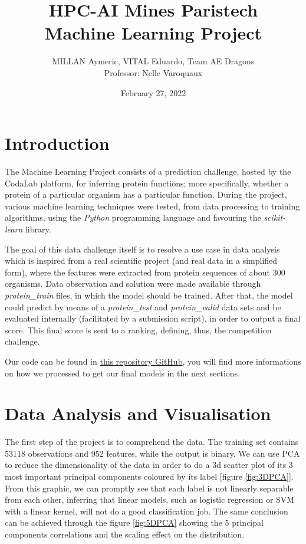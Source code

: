 \documentclass[letterpaper,11pt]{article}
\begin{document}
\title{HPC-AI Mines Paristech \\\textbf{Machine Learning Project}}
\author{MILLAN Aymeric, VITAL Eduardo, Team AE Dragons\\[1cm]{\small Professor: Nelle Varoquaux}}
\date{February 27, 2022}
\maketitle

\section{Introduction}

The Machine Learning Project consists of a prediction challenge, hosted by the CodaLab platform, for inferring protein functions; more specifically, whether a protein of a particular organism has a particular function. During the project, various machine learning techniques were tested, from data processing to training algorithms, using the \textit{Python} programming language and favouring the \textit{scikit-learn} library. 

The goal of this data challenge itself is to resolve a use case in data analysis which is inspired from a real scientific project (and real data in a simplified form), where the features were extracted from protein sequences of about 300 organisms. Data observation and solution were made available through \textit{protein\_train} files, in which the model should be trained. After that, the model could predict by means of a \textit{protein\_test} and \textit{protein\_valid} data sets and be evaluated internally (facilitated by a submission script), in order to output a final score. This final score is sent to a ranking, defining, thus, the competition challenge.

Our code can be found in
\href{https://github.com/Aympab/ML-project}{this repository GitHub},
you will find more informations on how we processed to get our final models in
the next sections.

\section{Data Analysis and Visualisation}
The first step of the project is to comprehend the data. The training set contains 53118 observations and 952 features, while the output is binary. We can use PCA to reduce the dimensionality of the data in order to do a 3d scatter plot of its 3 most important principal components coloured by its label [figure \ref{fig:3DPCA}]. From this graphic, we can promptly see that each label is not linearly separable from each other, inferring that linear models, such as logistic regression or SVM with a linear kernel, will not do a good classification job. The same conclusion can be achieved through the figure \ref{fig:5DPCA} showing the 5 principal components correlations and the scaling effect on the distribution.
\end{document}
